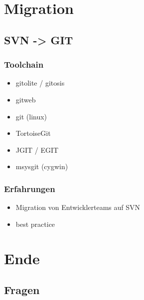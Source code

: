 \documentclass{beamer}
\begin{document}
	\section{Migration}

		\subsection{SVN -> GIT}

			\begin{frame}
				\frametitle{Toolchain}

				\begin{itemize}
					\item{gitolite / gitosis}
					\item{gitweb}
					\item{git (linux)}
					\item{TortoiseGit}
					\item{JGIT / EGIT}
					\item{msysgit (cygwin)}
				\end{itemize}
			\end{frame}

			\begin{frame}
				\frametitle{Erfahrungen}

				\begin{itemize}
					\item{Migration von Entwicklerteams auf SVN}
					\item{best practice}
				\end{itemize}
			\end{frame}

	\section{Ende}
		\subsection{Fragen}
\end{document}

